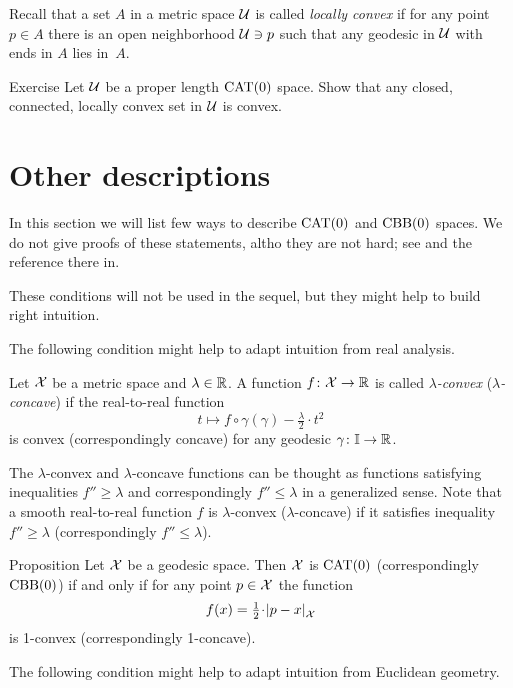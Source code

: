 Recall that a set $A$ in a metric space $\mathcal{U}$ is called \emph{locally convex} if for any point $p\in A$ there is an open neighborhood $\mathcal{U}\ni p$ such that any geodesic in $\mathcal{U}$ with  ends in $A$ lies in~$A$. 

\begin{thm}{Exercise}\label{ex:locally-convex}
Let $\mathcal{U}$ be a proper length $\mathrm{CAT}(0)$ space.
Show that any closed, connected, locally convex set in $\mathcal{U}$ is convex.
\end{thm}



\section{Other descriptions}

In this section we will list few ways to describe $\mathrm{CAT}(0)$ and $\mathrm{CBB}(0)$ spaces.
We do not give proofs of these statements, altho they are not hard;
see \cite{alexander-kapovitch-petrunin-2025} and the reference there in.

These conditions will not be used in the sequel, but they might help to build right intuition.  

The following condition might help to adapt intuition from real analysis.

Let $\mathcal{X}$ be a metric space and $\lambda\in\mathbb{R}$.
A function $f\colon\mathcal{X}\to \mathbb{R}$ is called \emph{$\lambda$-convex} (\emph{$\lambda$-concave}) if 
the real-to-real function 
\[t\mapsto f\circ\gamma(\gamma)-\tfrac{\lambda}{2}\cdot t^2\] 
is convex (correspondingly concave)
for any geodesic $\gamma\colon\mathbb{I}\to \mathbb{R}$.

The $\lambda$-convex  and $\lambda$-concave functions can be thought as functions satisfying inequalities $f''\ge\lambda$ and correspondingly $f''\le\lambda$ in a generalized sense.
Note that a smooth real-to-real function $f$ is $\lambda$-convex ($\lambda$-concave) if it satisfies inequality $f''\ge\lambda$ (correspondingly $f''\le\lambda$).

\begin{thm}{Proposition}
Let $\mathcal{X}$ be a geodesic space.
Then $\mathcal{X}$ is $\mathrm{CAT}(0)$ (correspondingly $\mathrm{CBB}(0)$) if and only if for any point $p\in \mathcal{X}$ the function
\[f(x)=\tfrac12\cdot\dist{p}{x}{\spc{X}}\]
is 1-convex (correspondingly 1-concave).
\end{thm}

The following condition might help to adapt intuition from Euclidean geometry.

